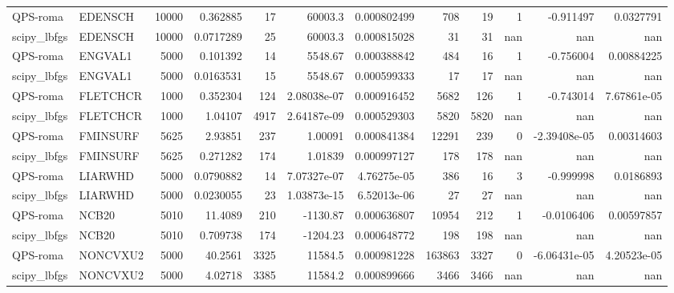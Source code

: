 \documentclass[a4paper]{article}
\begin{document}
\begin{tabular}{llrrrrrrrrrr}
	QPS-roma    & EDENSCH  & 10000 &  0.362885   &     17 &  60003.3         & 0.000802499 &      708 &       19 &        1 &  -0.911497    &    0.0327791   \\
	scipy\_lbfgs & EDENSCH  & 10000 &  0.0717289  &     25 &  60003.3         & 0.000815028 &       31 &       31 &      nan & nan           &  nan           \\
	QPS-roma    & ENGVAL1  &  5000 &  0.101392   &     14 &   5548.67        & 0.000388842 &      484 &       16 &        1 &  -0.756004    &    0.00884225  \\
	scipy\_lbfgs & ENGVAL1  &  5000 &  0.0163531  &     15 &   5548.67        & 0.000599333 &       17 &       17 &      nan & nan           &  nan           \\
	QPS-roma    & FLETCHCR &  1000 &  0.352304   &    124 &      2.08038e-07 & 0.000916452 &     5682 &      126 &        1 &  -0.743014    &    7.67861e-05 \\
	scipy\_lbfgs & FLETCHCR &  1000 &  1.04107    &   4917 &      2.64187e-09 & 0.000529303 &     5820 &     5820 &      nan & nan           &  nan           \\
	QPS-roma    & FMINSURF &  5625 &  2.93851    &    237 &      1.00091     & 0.000841384 &    12291 &      239 &        0 &  -2.39408e-05 &    0.00314603  \\
	scipy\_lbfgs & FMINSURF &  5625 &  0.271282   &    174 &      1.01839     & 0.000997127 &      178 &      178 &      nan & nan           &  nan           \\
	QPS-roma    & LIARWHD  &  5000 &  0.0790882  &     14 &      7.07327e-07 & 4.76275e-05 &      386 &       16 &        3 &  -0.999998    &    0.0186893   \\
	scipy\_lbfgs & LIARWHD  &  5000 &  0.0230055  &     23 &      1.03873e-15 & 6.52013e-06 &       27 &       27 &      nan & nan           &  nan           \\
	QPS-roma    & NCB20    &  5010 & 11.4089     &    210 &  -1130.87        & 0.000636807 &    10954 &      212 &        1 &  -0.0106406   &    0.00597857  \\
	scipy\_lbfgs & NCB20    &  5010 &  0.709738   &    174 &  -1204.23        & 0.000648772 &      198 &      198 &      nan & nan           &  nan           \\
	QPS-roma    & NONCVXU2 &  5000 & 40.2561     &   3325 &  11584.5         & 0.000981228 &   163863 &     3327 &        0 &  -6.06431e-05 &    4.20523e-05 \\
	scipy\_lbfgs & NONCVXU2 &  5000 &  4.02718    &   3385 &  11584.2         & 0.000899666 &     3466 &     3466 &      nan & nan           &  nan           \\

\end{tabular}
\end{document}
